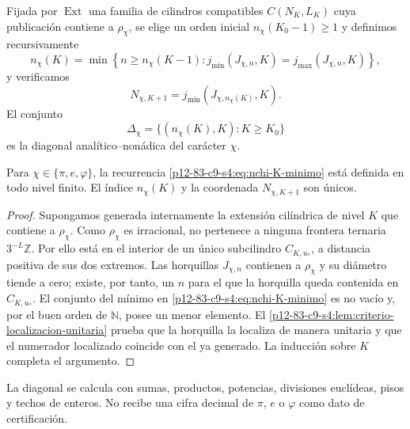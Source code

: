 \begin{definition}
\label{p12-83-c9-s4:def:recurrencia-diagonal-constantes}
Fijada por \(\operatorname{Ext}\) una familia de cilindros compatibles
\(C(N_K,L_K)\) cuya publicación contiene a \(\rho_\chi\), se elige un orden
inicial \(n_\chi(K_0-1)\geq1\) y definimos recursivamente
\begin{equation}
 n_\chi(K)=
 \min\left\{
 n\geq n_\chi(K-1):
 j_{\min}(J_{\chi,n},K)=j_{\max}(J_{\chi,n},K)
 \right\},
 \label{p12-83-c9-s4:eq:nchi-K-minimo}
\end{equation}
y verificamos
\begin{equation}
 N_{\chi,K+1}
 =j_{\min}(J_{\chi,n_\chi(K)},K).
 \label{p12-83-c9-s4:eq:Nchi-K-mas-uno}
\end{equation}
El conjunto
\[
 \Delta_\chi=
 \{(n_\chi(K),K):K\geq K_0\}
\]
es la diagonal analítico--nonádica del carácter \(\chi\).
\end{definition}

\begin{theorem}
\label{p12-83-c9-s4:thm:existencia-unicidad-diagonal}
Para \(\chi\in\{\pi,e,\varphi\}\), la recurrencia
\eqref{p12-83-c9-s4:eq:nchi-K-minimo} está definida en todo nivel finito. El índice
\(n_\chi(K)\) y la coordenada \(N_{\chi,K+1}\) son únicos.
\end{theorem}

\begin{proof}
Supongamos generada internamente la extensión cilíndrica de nivel \(K\) que contiene a
\(\rho_\chi\). Como \(\rho_\chi\) es irracional, no pertenece a ninguna
frontera ternaria \(3^{-L}\mathbb Z\). Por ello está en el interior de un
único subcilindro \(C_{K,u_*}\), a distancia positiva de sus dos extremos.
Las horquillas \(J_{\chi,n}\) contienen a \(\rho_\chi\) y su diámetro
tiende a cero; existe, por tanto, un \(n\) para el que la horquilla queda
contenida en \(C_{K,u_*}\). El conjunto del mínimo en
\eqref{p12-83-c9-s4:eq:nchi-K-minimo} es no vacío y, por el buen orden de
\(\mathbb N\), posee un menor elemento. El
\cref{p12-83-c9-s4:lem:criterio-localizacion-unitaria} prueba que la horquilla la
localiza de manera unitaria y que el numerador localizado coincide con el ya
generado. La inducción sobre \(K\) completa el argumento.
\end{proof}

\begin{corollary}
La diagonal se calcula con sumas, productos, potencias, divisiones euclídeas,
pisos y techos de enteros. No recibe una cifra decimal de \(\pi\), \(e\) o
\(\varphi\) como dato de certificación.
\end{corollary}

